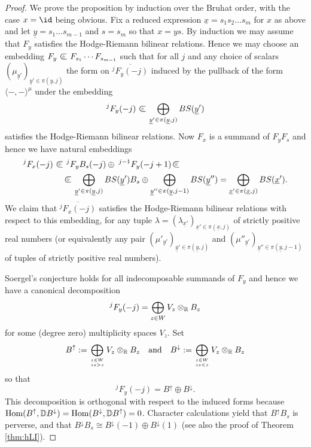 \documentclass[11pt]{amsart}
\numberwithin{equation}{section}
\def\l{\lambda}
\def\un{\underline}
\def\summand{
\mathbin{\tikz [baseline=-3pt]
{
\clip (-0.2,-0.15) rectangle (0.2,0.15);
\node[scale=1.2] at (0,0) {$\subset$}; \node[scale=0.5] at
  (0,0) {$\oplus$}; }}
}
\theoremstyle{definition}
\theoremstyle{remark}
\begin{document}
{\begin{proof} We prove the proposition by induction over the Bruhat
  order, with the case $x = \id$ being obvious.  Fix a reduced
  expression $\un{x} = s_1s_2 \dots s_m$ for $x$  as above and let
  $\un{y} = s_1 \dots s_{m-1}$ and $s = s_m$ so that $x = 
  ys$. By induction we may
assume that $F_{y}$ satisfies the Hodge-Riemann bilinear
relations. Hence we may choose an embedding $F_y \summand F_{s_1}
\cdots F_{s_{m-1}}$ such that for all $j$ and any choice of scalars
$(\mu_{\un{y}'})_{\un{y}' \in \pi(\un{y}, j)}$ the form on
  $\overline{{}^j F_y(-j)}$ induced by the pullback of the form
  $\langle -, - \rangle^{\mu}$ under the embedding
\[
{}^j F_y(-j) \summand \bigoplus_{\un{y}' \in \pi(\un{y}, j)} BS(\un{y}')
\]
satisfies the Hodge-Riemann bilinear relations. Now $F_x$ is a summand
of $F_yF_s$ and hence we have natural embeddings
\begin{align*}
{}^jF_x(-j) &\summand {}^jF_yB_s(-j) \oplus \; {}^{j-1}F_y(-j + 1)
\summand \\ & \quad 
\summand \bigoplus_{ \un{y}' \in \pi(\un{y}, j)} BS(\un{y}')B_s \oplus
\bigoplus_{ \un{y}'' \in \pi(\un{y}, j-1)} BS(\un{y}'') =
\bigoplus_{ \un{x}' \in \pi(\un{x}, j)} BS(\un{x}').
\end{align*}
We claim that $\overline{{}^j F_x(-j)}$ satisfies the Hodge-Riemann
bilinear relations with respect to this embedding, for any tuple $\l =
(\l_{\un{x}'})_{\un{x}' \in \pi(\un{x}, j)}$  of strictly positive
real numbers (or equivalently any pair $(\mu'_{\un{y}'})_{\un{y}' \in
  \pi(\un{y}, j)}$ and $(\mu''_{\un{y}'})_{\un{y}'' \in \pi(\un{y}, j-1)}$
  of tuples of strictly positive real numbers).

Soergel's conjecture holds for all indecomposable summands of $F_{y}$
and hence we have a
canonical decomposition
\[ {}^jF_{y}(-j) = \bigoplus_{z \in W} V_z
\otimes_{{\mathbb{R}}} B_z\]
for some (degree zero) multiplicity spaces $V_z$. Set \[
B^{\uparrow} := \bigoplus_{z \in W \atop zs > z} V_z \otimes_{{\mathbb{R}}} B_z 
\quad \text{and} \quad B^{\downarrow} := \bigoplus_{z \in W \atop zs <
  z} V_z \otimes_{{\mathbb{R}}} B_z \] so that
\begin{equation} \label{eq:Fydecomp} {}^jF_{y}(-j) = 
B^{\uparrow} \oplus B^{\downarrow}.\end{equation}
This decomposition is
orthogonal with respect to the induced forms because
$\operatorname{Hom}(B^{\uparrow},  {\mathbb{D}} B^{\downarrow}) = \operatorname{Hom}(B^{\downarrow} ,{\mathbb{D}} B^{\uparrow}) = 0$. Character calculations yield that $B^{\uparrow}B_s$ is perverse, and that $B^{\downarrow}B_s \cong B^{\downarrow}(-1) \oplus
B^{\downarrow}(1)$ (see also the proof of Theorem \ref{thm:hLI}).


\end{proof}}
\end{document}
